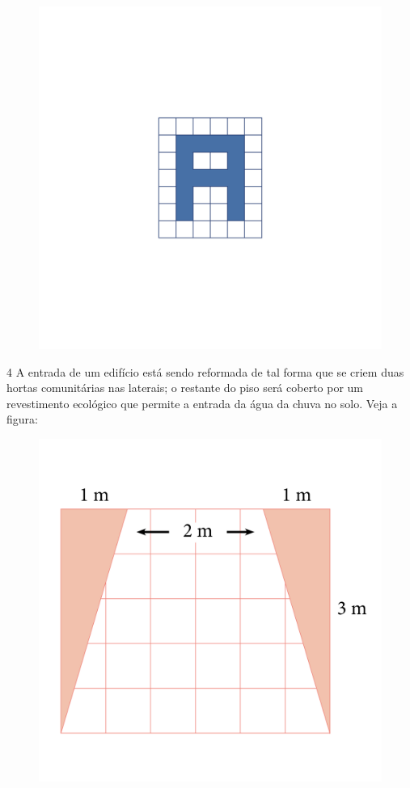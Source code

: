 \begin{figure}[htpb!]
\includegraphics[width=\textwidth]{../ilustracoes/MAT5/SAEB_5ANO_MAT_figura37.png}
\end{figure}



\num{4} A entrada de um edifício está sendo reformada de tal forma que se
criem duas hortas comunitárias nas laterais; o restante do piso será coberto por um revestimento ecológico que permite a entrada da água da chuva no solo. Veja
a figura:

\begin{figure}[htpb!]
\includegraphics[width=\textwidth]{../ilustracoes/MAT5/SAEB_5ANO_MAT_figura38.png}
\end{figure}

